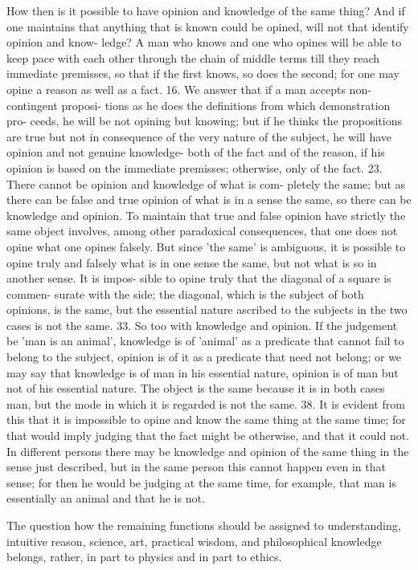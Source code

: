 {How then is it possible to have opinion and knowledge of
the same thing? And if one maintains that anything that is
known could be opined, will not that identify opinion and know-
ledge? A man who knows and one who opines will be able to
keep pace with each other through the chain of middle terms till
they reach immediate premisses, so that if the first knows, so
does the second; for one may opine a reason as well as a fact.
16. We answer that if a man accepts non-contingent proposi-
tions as he does the definitions from which demonstration pro-
ceeds, he will be not opining but knowing; but if he thinks the
propositions are true but not in consequence of the very nature
of the subject, he will have opinion and not genuine knowledge-
both of the fact and of the reason, if his opinion is based on the
immediate premisses; otherwise, only of the fact.
23. There cannot be opinion and knowledge of what is com-
pletely the same; but as there can be false and true opinion of
what is in a sense the same, so there can be knowledge and opinion.
To maintain that true and false opinion have strictly the same
object involves, among other paradoxical consequences, that one
does not opine what one opines falsely. But since 'the same' is
ambiguous, it is possible to opine truly and falsely what is in one
sense the same, but not what is so in another sense. It is impos-
sible to opine truly that the diagonal of a square is commen-
surate with the side; the diagonal, which is the subject of both
opinions, is the same, but the essential nature ascribed to the
subjects in the two cases is not the same.
33. So too with knowledge and opinion. If the judgement be
'man is an animal', knowledge is of 'animal' as a predicate that
cannot fail to belong to the subject, opinion is of it as a predicate
that need not belong; or we may say that knowledge is of man
in his essential nature, opinion is of man but not of his essential
nature. The object is the same because it is in both cases man,
but the mode in which it is regarded is not the same.
38. It is evident from this that it is impossible to opine and
know the same thing at the same time; for that would imply
judging that the fact might be otherwise, and that it could not.
In different persons there may be knowledge and opinion of the
same thing in the sense just described, but in the same person
this cannot happen even in that sense; for then he would be
judging at the same time, for example, that man is essentially an
animal and that he is not.

The question how the remaining functions should be assigned to
understanding, intuitive reason, science, art, practical
wisdom, and philosophical knowledge belongs, rather, in part to
physics and in part to ethics.

}
